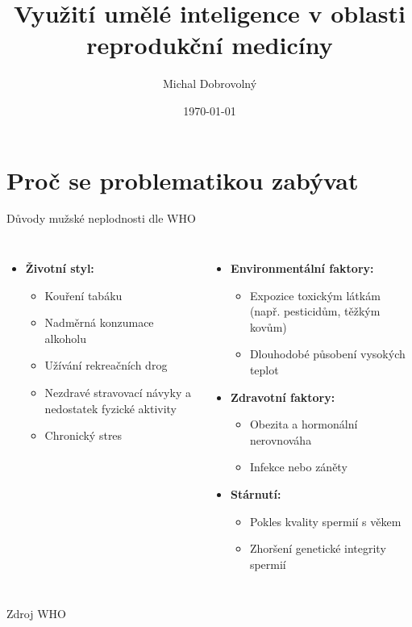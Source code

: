 \documentclass[aspectratio=169]{beamer}
\title[Short Title]{Využití umělé inteligence v oblasti\\reprodukční medicíny}
\author{Michal Dobrovolný}
\institute[UHK FIM]{University of Hradec Kralove, Faculty of Informatics and Management}
\date{\today}
\begin{document}
\begin{frame}
    \titlepage
\end{frame}










\section{Proč se problematikou zabývat}



\begin{frame}{Důvody mužské neplodnosti dle WHO}
    \begin{columns}
        \begin{itemize}
            \item \textbf{Životní styl:}
            \begin{itemize}
                \item Kouření tabáku
                \item Nadměrná konzumace alkoholu
                \item Užívání rekreačních drog
                \item Nezdravé stravovací návyky a nedostatek fyzické aktivity
                \item Chronický stres
            \end{itemize}
        \end{itemize}
        
        \begin{itemize}
            \item \textbf{Environmentální faktory:}
            \begin{itemize}
                \item Expozice toxickým látkám (např. pesticidům, těžkým kovům)
                \item Dlouhodobé působení vysokých teplot
            \end{itemize}
            \item \textbf{Zdravotní faktory:}
            \begin{itemize}
                \item Obezita a hormonální nerovnováha
                \item Infekce nebo záněty
            \end{itemize}
            \item \textbf{Stárnutí:}
            \begin{itemize}
                \item Pokles kvality spermií s věkem
                \item Zhoršení genetické integrity spermií
            \end{itemize}
        \end{itemize}
    \end{columns}
    \centering
    \scriptsize
    Zdroj WHO \textcite{world_health_organization_who_2021}
\end{frame}
\end{document}
